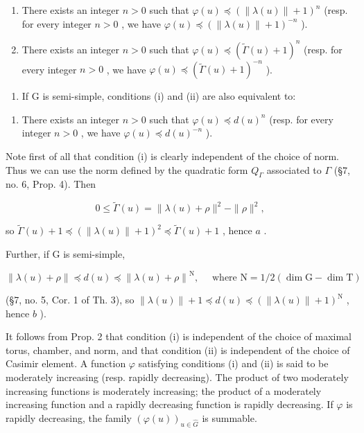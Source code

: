\begin{enumerate}
\def\labelenumi{(\roman{enumi})}
\item
  There exists an integer \(n > 0\) such that \(\varphi(u) \preccurlyeq (\|\lambda(u)\| + 1)^n\) (resp. for every integer \(n > 0\) , we have \(\varphi(u) \preccurlyeq (\|\lambda(u)\| + 1)^{-n}\) ).
\item
  There exists an integer \(n > 0\) such that \(\varphi(u) \preccurlyeq (\tilde{\Gamma}(u) + 1)^n\) (resp. for every integer \(n > 0\) , we have \(\varphi(u) \preccurlyeq (\tilde{\Gamma}(u) + 1)^{-n}\) ).
\end{enumerate}

\begin{enumerate}
\def\labelenumi{\alph{enumi})}
\setcounter{enumi}{1}
\tightlist
\item
  If \(\mathrm{G}\) is semi-simple, conditions (i) and (ii) are also equivalent to:
\end{enumerate}

\begin{enumerate}
\def\labelenumi{(\roman{enumi})}
\setcounter{enumi}{2}
\tightlist
\item
  There exists an integer \(n > 0\) such that \(\varphi(u) \preccurlyeq d(u)^n\) (resp. for every integer \(n > 0\) , we have \(\varphi(u) \preccurlyeq d(u)^{-n}\) ).
\end{enumerate}

Note first of all that condition (i) is clearly independent of the choice of norm. Thus we can use the norm defined by the quadratic form \(Q_{\varGamma}\) associated to \(\varGamma\) (§7, no. 6, Prop. 4). Then

\[
0 \leq \tilde {\Gamma} (u) = \| \lambda (u) + \rho \| ^ {2} - \| \rho \| ^ {2},
\]

so \(\tilde{\Gamma}(u) + 1 \preccurlyeq (\|\lambda(u)\| + 1)^2 \preccurlyeq \tilde{\Gamma}(u) + 1\) , hence \(a\) .

Further, if G is semi-simple,

\[
\left\| \lambda (u) + \rho \right\| \preccurlyeq d (u) \preccurlyeq \left\| \lambda (u) + \rho \right\| ^ {\mathrm{N}}, \quad \text { where } \mathrm{N} = 1 / 2 (\dim \mathrm{G} - \dim \mathrm{T})
\]

(§7, no. 5, Cor. 1 of Th. 3), so \(\| \lambda(u) \| + 1 \preccurlyeq d(u) \preccurlyeq (\| \lambda(u) \| + 1)^{\mathrm{N}}\) , hence \(b\) ).

It follows from Prop. 2 that condition (i) is independent of the choice of maximal torus, chamber, and norm, and that condition (ii) is independent of the choice of Casimir element. A function \(\varphi\) satisfying conditions (i) and (ii) is said to be moderately increasing (resp. rapidly decreasing). The product of two moderately increasing functions is moderately increasing; the product of a moderately increasing function and a rapidly decreasing function is rapidly decreasing. If \(\varphi\) is rapidly decreasing, the family \((\varphi(u))_{u\in\hat{G}}\) is summable.

